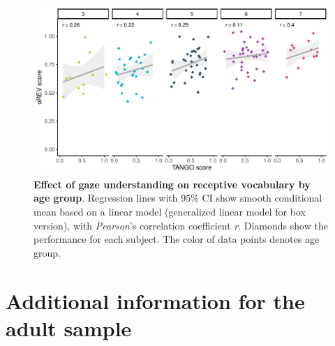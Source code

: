 \documentclass[
  man,floatsintext]{apa6}
\begin{document}
\begin{figure}

{\centering \includegraphics[width=1\linewidth]{../figures/tango_supplements_orev_byagegroup} 

}

\caption{\textbf{Effect of gaze understanding on receptive vocabulary by age group}. Regression lines with 95\% CI show smooth conditional mean based on a linear model (generalized linear model for box version), with \emph{Pearson}'s correlation coefficient \emph{r}. Diamonds show the performance for each subject. The color of data points denotes age group.}\label{fig:fig6}
\end{figure}

\newpage

\hypertarget{additional-information-for-the-adult-sample}{%
\section{Additional information for the adult sample}\label{additional-information-for-the-adult-sample}}
\end{document}
